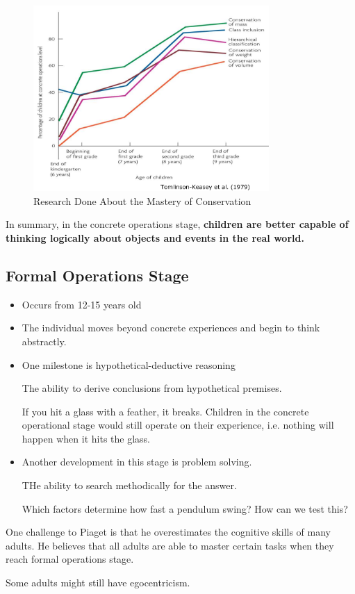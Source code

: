 \documentclass[../main/main.tex]{subfiles}
\begin{document}
\begin{figure}[h!]
  \centering
  \includegraphics[width=0.8\textwidth]{../images/3-3-con}
  \caption{Research Done About the Mastery of Conservation}
\end{figure}

In summary, in the concrete operations stage, \textbf{children are better capable of thinking logically about objects and events in the real world.}

\subsection{Formal Operations Stage}
\begin{itemize}
  \item Occurs from 12-15 years old
\item The individual moves beyond concrete experiences and begin to think abstractly.
  \item One milestone is hypothetical-deductive reasoning
        \begin{definition}
 The ability to derive conclusions from hypothetical premises.
        \end{definition}
        \begin{example}
If you hit a glass with a feather, it breaks. Children in the concrete operational stage would still operate on their experience, i.e. nothing will happen when it hits the glass.
        \end{example}
  \item Another development in this stage is problem solving.
        \begin{definition} THe ability to search methodically for the answer.
        \end{definition}
        \begin{example}
Which factors determine how fast a pendulum swing? How can we test this?
        \end{example}
\end{itemize}
One challenge to Piaget is that he overestimates the cognitive skills of many adults. He believes that all adults are able to master certain tasks when they reach formal operations stage.
\begin{example}
Some adults might still have egocentricism.
\end{example}
\end{document}
